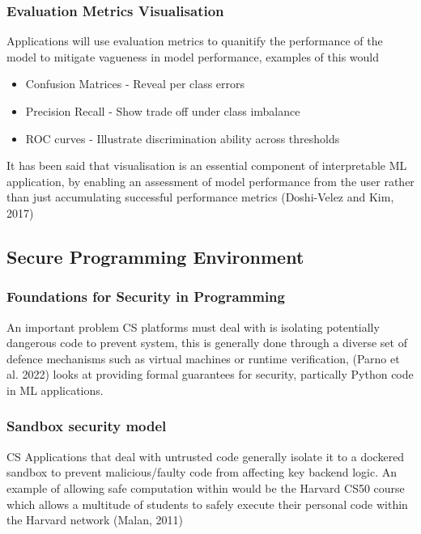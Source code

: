 \documentclass{article}
\begin{document}
\subsubsection{Evaluation Metrics Visualisation} %
Applications will use evaluation metrics to quanitify the performance of the model to mitigate vagueness in model performance, examples of this would 

\begin{itemize}
    \item Confusion Matrices - Reveal per class errors
    \item Precision Recall - Show trade off under class imbalance %
    \item ROC curves - Illustrate discrimination ability across thresholds %
\end{itemize}

It has been said that visualisation is an essential component of interpretable ML application, by enabling an assessment of model performance from the user rather than just accumulating successful performance metrics (Doshi-Velez and Kim, 2017)
\subsection{Secure Programming Environment} %
\subsubsection{Foundations for Security in Programming}
An important problem CS platforms must deal with is isolating potentially dangerous code to prevent system, this is generally done through a diverse set of defence mechanisms such as virtual machines or runtime verification, (Parno et al. 2022) looks at providing formal guarantees for security, partically Python code in ML applications. 
\subsubsection{Sandbox security model}
CS Applications that deal with untrusted code generally isolate it to a dockered sandbox to prevent malicious/faulty code from affecting key backend logic. An example of allowing safe computation within would be the Harvard CS50 course which allows a multitude of students to safely execute their personal code within the Harvard network (Malan, 2011)
\end{document}
